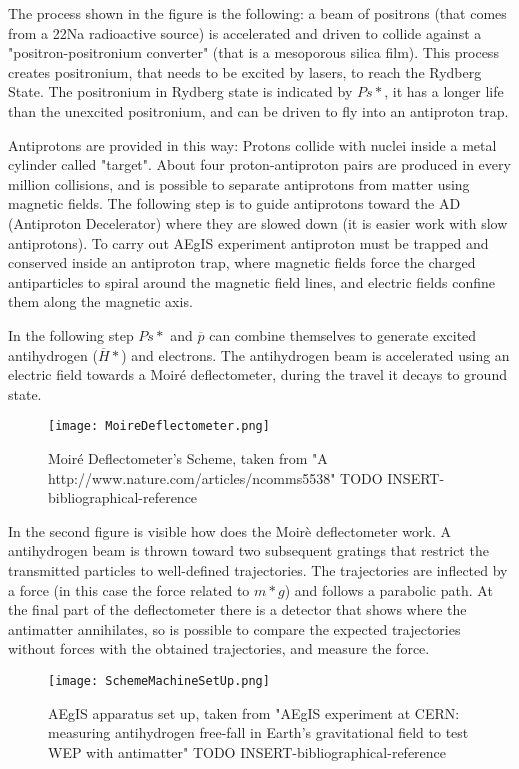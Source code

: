 The process shown in the figure is the following: a beam of positrons (that comes from a 22Na radioactive source) is accelerated and driven to collide against a "positron-positronium converter" (that is a mesoporous silica film). This process creates positronium, that needs to be excited by lasers, to reach the Rydberg State. The positronium in Rydberg state is indicated by $ {Ps*} $, it has a longer life than the unexcited positronium, and can be driven to fly into an antiproton trap.

Antiprotons are provided in this way:
Protons collide with nuclei inside a metal cylinder called "target". About four proton-antiproton pairs are produced in every million collisions, and is possible to separate antiprotons from matter using magnetic fields. The following step is to guide antiprotons toward the AD (Antiproton Decelerator) where they are slowed down (it is easier work with slow antiprotons). To carry out AEgIS experiment antiproton must be trapped and conserved inside an antiproton trap, where magnetic fields force the charged antiparticles to spiral around the magnetic field lines, and electric fields confine them along the magnetic axis.

In the following step $ {Ps*} $ and $ \overline{p} $ can combine themselves to generate excited antihydrogen ($ \overline{H}* $) and electrons. The antihydrogen beam is accelerated using an electric field towards a Moiré deflectometer, during the travel it decays to ground state.  


\begin{figure}[H]
\centering
\texttt{[image: MoireDeflectometer.png]} 
\caption{Moiré Deflectometer's Scheme, taken from "A
http://www.nature.com/articles/ncomms5538" TODO INSERT-bibliographical-reference}
\end{figure}

In the second figure is visible how does the Moirè deflectometer work.
A antihydrogen beam is thrown toward two subsequent gratings that restrict the transmitted particles to well-defined trajectories. The trajectories are inflected by a force (in this case the force related to $ {m*g} $) and follows a parabolic path. At the final part of the deflectometer there is a detector that shows where the antimatter annihilates, so is possible to compare the expected trajectories without forces with the obtained trajectories, and measure the force.


\begin{figure}[H]
\centering
\texttt{[image: SchemeMachineSetUp.png]} 
\caption{AEgIS apparatus set up, taken from "AEgIS experiment at CERN: measuring antihydrogen free-fall in Earth’s gravitational field to test WEP with antimatter" TODO INSERT-bibliographical-reference}
\end{figure}

